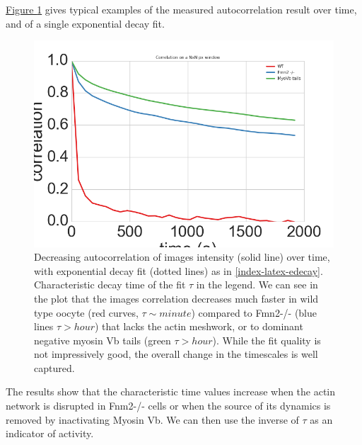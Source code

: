 \documentclass[A4paperpaper,11pt,english]{sphinxmanual}
\begin{document}
\hyperref[index-latex:fig-exp-decay]{Figure  \ref*{index-latex:fig-exp-decay}} gives typical examples of the
measured autocorrelation result over time, and of a single exponential decay fit.
\begin{figure}[htbp]
\centering
\capstart

\includegraphics[width=0.650\linewidth]{corrtime.png}
\caption{Decreasing autocorrelation of images intensity (solid line) over time, with
exponential decay fit (dotted lines) as in \eqref{index-latex-edecay}. Characteristic decay time of the fit
\(\tau\) in the legend. We can see in the plot that the
images correlation decreases much faster in wild type oocyte (red
curves, \(\tau \sim minute\)) compared to Fmn2-/- (blue lines
\(\tau > hour\)) that lacks the actin meshwork, or to dominant negative myosin Vb
tails (green \(\tau > hour\)). While the fit quality is not impressively good, the
overall change in the timescales is well captured.}\label{index-latex:fig-exp-decay}\end{figure}

The results show that the characteristic time values increase when
the actin network is disrupted in Fnm2-/- cells or when the source of its dynamics is removed by inactivating
Myosin Vb. We can then use the inverse of \(\tau\) as an indicator of
activity.
\end{document}
